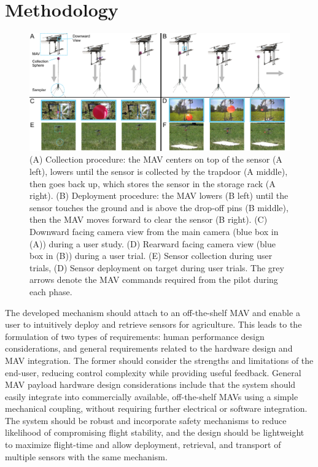 \section{Methodology}

\begin{figure}[!htp]
\centering
\includegraphics[width=\textwidth]{chapters/papers/UR/figures/fig-3a-working-principle/fig-3a-working-principle.pdf}
\caption{(A) Collection procedure: the \gls{MAV} centers on top of the sensor (A left), lowers until the sensor is collected by the trapdoor (A middle), then goes back up, which stores the sensor in the storage rack (A right). (B) Deployment procedure: the \gls{MAV} lowers (B left) until the sensor touches the ground and is above the drop-off pins (B middle), then the \gls{MAV} moves forward to clear the sensor (B right).  (C) Downward facing camera view from the main camera (blue box in (A)) during a user study. (D) Rearward facing camera view (blue box in (B)) during a user trial. (E) Sensor collection during user trials, (D) Sensor deployment on target during user trials. The grey arrows denote the \gls{MAV} commands required from the pilot during each phase.}
\label{fig:fig3a-working-principle}
\figurevspacebelow
\end{figure}

The developed mechanism should attach to an off-the-shelf \gls{MAV} and enable a user to intuitively deploy and retrieve sensors for agriculture. This leads to the formulation of two types of requirements: human performance design considerations, and general requirements related to the hardware design and \gls{MAV} integration. The former should consider the strengths and limitations of the end-user, reducing control complexity while providing useful feedback.
General \gls{MAV} payload hardware design considerations include that the system should easily integrate into commercially available, off-the-shelf \glspl{MAV} using a simple mechanical coupling, without requiring further electrical or software integration. The system should be robust and incorporate safety mechanisms to reduce likelihood of compromising flight stability, and the design should be lightweight to maximize flight-time and allow deployment, retrieval, and transport of multiple sensors with the same mechanism.


